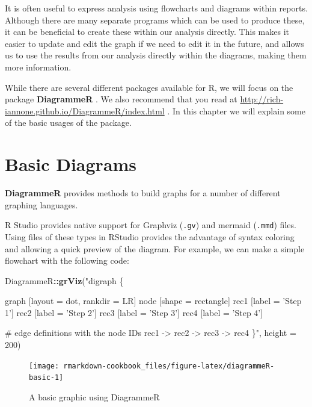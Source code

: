 \documentclass[]{book}
\newenvironment{Shaded}{\begin{snugshade}}{\end{snugshade}}
\newcommand{\KeywordTok}[1]{\textcolor[rgb]{0.13,0.29,0.53}{\textbf{#1}}}
\newcommand{\DataTypeTok}[1]{\textcolor[rgb]{0.13,0.29,0.53}{#1}}
\newcommand{\DecValTok}[1]{\textcolor[rgb]{0.00,0.00,0.81}{#1}}
\newcommand{\StringTok}[1]{\textcolor[rgb]{0.31,0.60,0.02}{#1}}
\newcommand{\OperatorTok}[1]{\textcolor[rgb]{0.81,0.36,0.00}{\textbf{#1}}}
\newcommand{\NormalTok}[1]{#1}
\begin{document}
It is often useful to express analysis using flowcharts and diagrams
within reports. Although there are many separate programs which can be
used to produce these, it can be beneficial to create these within our
analysis directly. This makes it easier to update and edit the graph if
we need to edit it in the future, and allows us to use the results from
our analysis directly within the diagrams, making them more information.

While there are several different packages available for R, we will
focus on the package \textbf{DiagrammeR} \citep{R-DiagrammeR}. We also
recommend that you read at
\url{http://rich-iannone.github.io/DiagrammeR/index.html} . In this
chapter we will explain some of the basic usages of the package.

\section{Basic Diagrams}\label{basic-diagrams}

\textbf{DiagrammeR} provides methods to build graphs for a number of
different graphing languages.

R Studio provides native support for Graphviz (\texttt{.gv}) and mermaid
(\texttt{.mmd}) files. Using files of these types in RStudio provides
the advantage of syntax coloring and allowing a quick preview of the
diagram. For example, we can make a simple flowchart with the following
code:

\begin{Shaded}
\begin{Highlighting}[]
\NormalTok{DiagrammeR}\OperatorTok{::}\KeywordTok{grViz}\NormalTok{(}\StringTok{"digraph \{}

\StringTok{        graph [layout = dot, rankdir = LR]}
\StringTok{        }
\StringTok{        node [shape = rectangle]        }
\StringTok{        rec1 [label = 'Step 1']}
\StringTok{        rec2 [label = 'Step 2']}
\StringTok{        rec3 [label =  'Step 3']}
\StringTok{        rec4 [label = 'Step 4']}

\StringTok{        # edge definitions with the node IDs}
\StringTok{        rec1 -> rec2 -> rec3 -> rec4}
\StringTok{        \}"}\NormalTok{,}
        \DataTypeTok{height =} \DecValTok{200}\NormalTok{)}
\end{Highlighting}
\end{Shaded}

\begin{figure}

{\centering \texttt{[image: rmarkdown-cookbook\_files/figure-latex/diagrammeR-basic-1]} 

}

\caption{A basic graphic using DiagrammeR}\label{fig:diagrammeR-basic}
\end{figure}
\end{document}
